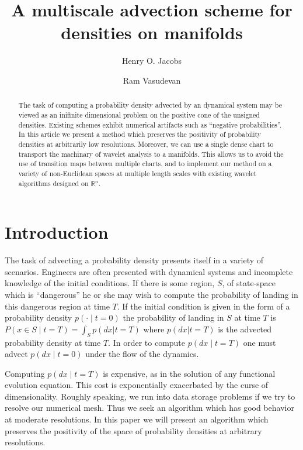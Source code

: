 \documentclass[letterpaper, 12 pt]{amsart}
\title{
  A 
  multiscale
  advection scheme for
  densities on manifolds
}
\author{Henry O. Jacobs}
\author{Ram Vasudevan}
\newcommand{\R}{\mathbb{R}}
\begin{document}
\maketitle

\begin{abstract}
  The task of computing a probability density advected by an 
  dynamical system may be viewed as an inifinite dimensional problem
  on the positive cone of the unsigned densities.
  Existing schemes exhibit numerical artifacts such as
  ``negative probabilities''.
  In this article we present a method
  which preserves the positivity of probability densities
  at arbitrarily low resolutions.
  Moreover, we can use a single dense chart to transport the machinary of wavelet analysis to a manifolds.
  This allows us to avoid the use of transition maps between multiple charts, and to implement our method on a variety of non-Euclidean spaces at multiple length scales with existing wavelet algorithms designed on $\R^n$.
\end{abstract}


\section{Introduction}
  The task of advecting a probability density presents itself
  in a variety of scenarios.
  Engineers are often presented
  with dynamical systems and incomplete knowledge
  of the initial conditions.
  If there is some region, $S$, of state-space which is ``dangerous''
  he or she may wish to compute the probability of landing
  in this dangerous region at time $T$.
  If the initial condition is given in the form of a
  probability density $p(\cdot \mid t=0)$
  the probability of landing in $S$ at time $T$
  is $P( x \in S \mid t = T)  = \int_S p( dx | t=T )$
  where $p(dx|t=T)$ is the advected probability density at time $T$.
  In order to compute $p(dx\mid t=T)$
  one must advect $p(dx\mid t=0)$ under the flow of the dynamics.
  
  Computing $p(dx \mid t=T)$ is expensive, as in the solution of any
  functional evolution equation.
  This cost is exponentially exacerbated by the curse of dimensionality.
  Roughly speaking, we run into data storage problems if we try to resolve
  our numerical mesh.
  Thus we seek an algorithm which has good behavior at moderate resolutions.
  In this paper we will present an algorithm which preserves the positivity
  of the space of probability densities at arbitrary resolutions.
\end{document}
